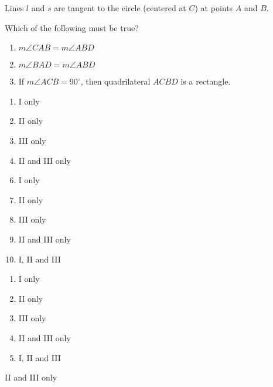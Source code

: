 


  Lines $l$ and $s$ are tangent to the circle (centered at $C$) at points $A$ and $B$.

\begin{center}
\end{center}
Which of the following must be true?

\begin{enumerate}[label=\Roman*.]
\item $m\angle CAB=m\angle ABD$ 
\item $m\angle BAD=m\angle ABD$ 
\item If $m\angle ACB=90^\circ$, then quadrilateral $ACBD$ is a rectangle.
\end{enumerate}




\ifsat
	\begin{enumerate}[label=\Alph*)]
		\item  I only 
		\item  II only
		\item  III only
		\item  II and III only %
	\end{enumerate}
\else
\fi

\ifacteven
	\begin{enumerate}[label=\textbf{\Alph*.},itemsep=\fill,align=left]
		\setcounter{enumii}{5}
		\item  I only 
		\item  II only
		\item  III only
		\addtocounter{enumii}{1}
		\item  II and III only %
		\item  I, II and III
	\end{enumerate}
\else
\fi

\ifactodd
	\begin{enumerate}[label=\textbf{\Alph*.},itemsep=\fill,align=left]
		\item  I only 
		\item  II only
		\item  III only
		\item  II and III only %
		\item  I, II and III
	\end{enumerate}
\else
\fi

\ifgridin
  II and III only %

\else
\fi

